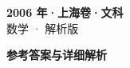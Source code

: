 \documentclass[zihao=-4, a4paper]{ctexart}
\begin{document}
\begin{center}
  {\Large\bfseries 2006 年·上海卷·文科}\\[4pt]
  {\large 数学 · 解析版}
\end{center}
\medskip
{}

\clearpage
{}
\begin{center}{\Large\bfseries 参考答案与详细解析}\end{center}
\medskip

\end{document}
